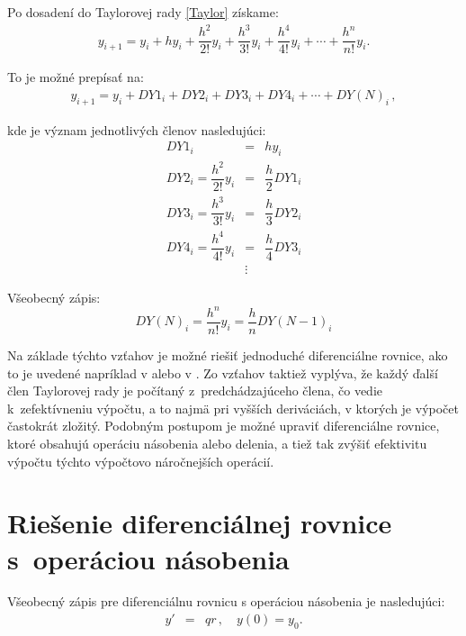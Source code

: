 Po dosadení do Taylorovej rady \eqref{Taylor} získame:
\begin{eqnarray}
y_{i + 1} = y_{i} + h y_{i} + \dfrac{h^{2}}{2!}y_{i} + \dfrac{h^{3}}{3!}y_{i} + \dfrac{h^{4}}{4!}y_{i} + \cdots + \dfrac{h^{n}}{n!}y_{i} .
\end{eqnarray}


To je možné prepísať na:
\begin{eqnarray}
y_{i + 1} = y_{i} + DY1_{i} + DY2_{i} + DY3_{i} + DY4_{i} + \cdots + DY(N)_{i} \, , \label{TaylorDYcleny}
\end{eqnarray}

kde je význam jednotlivých členov nasledujúci:
\begin{eqnarray}
DY1_{i} & = & h y_{i} \label{DY_cleny} \\
DY2_{i} = \dfrac{h^{2}}{2!}y_{i} & = & \dfrac{h}{2} DY1_{i} \nonumber \\
DY3_{i} = \dfrac{h^{3}}{3!}y_{i} & = & \dfrac{h}{3} DY2_{i} \nonumber \\
DY4_{i} = \dfrac{h^{4}}{4!}y_{i} & = & \dfrac{h}{4} DY3_{i} \nonumber \\
& \vdots & \nonumber
\end{eqnarray}

Všeobecný zápis:
\begin{equation}
DY(N)_{i} =  \dfrac{h^{n}}{n!}y_{i} = \dfrac{h}{n} DY(N-1)_{i} \nonumber
\end{equation}

Na základe týchto vzťahov je možné riešiť jednoduché diferenciálne rovnice, ako to je uvedené napríklad v \cite{OpalkaBP} alebo v \cite{KrausDisP}.
Zo vzťahov taktiež vyplýva, že každý ďalší člen Taylorovej rady je počítaný z~predchádzajúceho člena, čo vedie k~zefektívneniu výpočtu, a to najmä pri vyšších deriváciách, v ktorých je výpočet častokrát zložitý. Podobným postupom je možné upraviť diferenciálne rovnice, ktoré obsahujú operáciu násobenia alebo delenia, a tiež tak zvýšiť efektivitu výpočtu týchto výpočtovo náročnejších operácií. 


\section{Riešenie diferenciálnej rovnice s~operáciou násobenia}
Všeobecný zápis pre diferenciálnu rovnicu s operáciou násobenia je nasledujúci:
\begin{eqnarray}
y' & = & qr \, , \quad y(0) = y_{0} . \label{dif_nasobenie}
\end{eqnarray}

